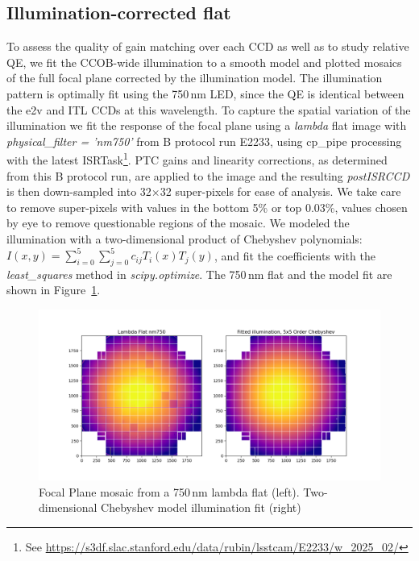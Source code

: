 \clearpage
\subsection{Illumination-corrected flat}

To assess the quality of gain matching over each CCD as well as to study relative QE, we fit the CCOB-wide illumination to a smooth model and plotted mosaics of the full focal plane corrected by the illumination model. The illumination pattern is optimally fit using the 750\,nm LED, since the QE is identical between the e2v and ITL CCDs at this wavelength. To capture the spatial variation of the illumination we fit the response of the focal plane using a {\it lambda} flat image with {\it physical\_filter = 'nm750'} from B protocol run E2233, using cp\_pipe processing with the latest ISRTask\footnote{See \url{https://s3df.slac.stanford.edu/data/rubin/lsstcam/E2233/w_2025_02/}}. PTC gains and linearity corrections, as determined from this B protocol run, are applied to the image and the resulting {\it postISRCCD} is then down-sampled into 32$\times$32 super-pixels for ease of analysis. We take care to remove super-pixels with values in the bottom 5\% or top 0.03\%, values chosen by eye to remove questionable regions of the mosaic.  We modeled the illumination with a two-dimensional product of Chebyshev polynomials: $ I(x,y) = \sum_{i=0}^{5} \sum_{j=0}^{5} c_{ij} T_i(x) T_j(y)$, and fit the coefficients with the {\it least\_squares} method in {\it scipy.optimize}.  The 750\,nm flat and the model fit are shown in Figure~\ref{fig:mosaic-modelfit}.

\begin{figure}[ht]
    \centering
    \includegraphics[width=0.95\linewidth]{figures/lambda_nm750_withfit.png}
    \caption{Focal Plane mosaic from a 750\,nm lambda flat (left). Two-dimensional Chebyshev model illumination fit (right)}
    \label{fig:mosaic-modelfit}
\end{figure}

